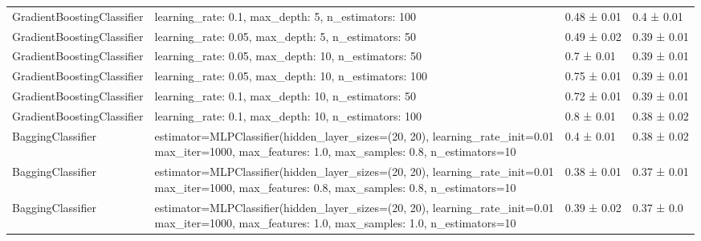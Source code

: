 \begin{tabular}{llll}
    GradientBoostingClassifier & learning\_rate: 0.1, max\_depth: 5, n\_estimators: 100                                                                               & 0.48 ± 0.01    & 0.4 ± 0.01          \\
    GradientBoostingClassifier & learning\_rate: 0.05, max\_depth: 5, n\_estimators: 50                                                                               & 0.49 ± 0.02    & 0.39 ± 0.01         \\
    GradientBoostingClassifier & learning\_rate: 0.05, max\_depth: 10, n\_estimators: 50                                                                              & 0.7 ± 0.01     & 0.39 ± 0.01         \\
    GradientBoostingClassifier & learning\_rate: 0.05, max\_depth: 10, n\_estimators: 100                                                                             & 0.75 ± 0.01    & 0.39 ± 0.01         \\
    GradientBoostingClassifier & learning\_rate: 0.1, max\_depth: 10, n\_estimators: 50                                                                               & 0.72 ± 0.01    & 0.39 ± 0.01         \\
    GradientBoostingClassifier & learning\_rate: 0.1, max\_depth: 10, n\_estimators: 100                                                                              & 0.8 ± 0.01     & 0.38 ± 0.02         \\
    \addlinespace[15pt]
    BaggingClassifier          & \makecell[l]{estimator=MLPClassifier(hidden\_layer\_sizes=(20, 20),                                        learning\_rate\_init=0.01                                        \\max\_iter=1000, max\_features: 1.0, max\_samples: 0.8, n\_estimators=10} & 0.4 ± 0.01     & 0.38 ± 0.02         \\
    \addlinespace[15pt]
    BaggingClassifier          & \makecell[l]{estimator=MLPClassifier(hidden\_layer\_sizes=(20, 20),                                        learning\_rate\_init=0.01                                        \\max\_iter=1000, max\_features: 0.8, max\_samples: 0.8, n\_estimators=10}                                                                    & 0.38 ± 0.01    & 0.37 ± 0.01         \\
    \addlinespace[15pt]
    BaggingClassifier          & \makecell[l]{estimator=MLPClassifier(hidden\_layer\_sizes=(20, 20),                                        learning\_rate\_init=0.01                                        \\max\_iter=1000, max\_features: 1.0, max\_samples: 1.0, n\_estimators=10}                                                                    & 0.39 ± 0.02    & 0.37 ± 0.0          \\

\end{tabular}

